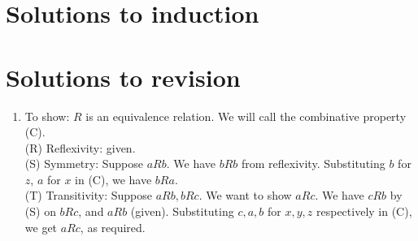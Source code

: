 \documentclass[10pt,a4paper]{article}
\begin{document}
\newpage

\section{Solutions to induction}

\section{Solutions to revision}
\begin{enumerate}
    \item To show: \(R\) is an equivalence relation. We will call the combinative property (C).\\
    (R) Reflexivity: given. \\
    (S) Symmetry: Suppose \( a R b \). We have \(b R b\) from reflexivity.
    Substituting \(b\) for \(z\), \(a\) for \(x\) in (C), we have \(b R a\). \\
    (T) Transitivity: Suppose \( a R b, b R c \). We want to show \( a R c \).
    We have \(c R b\) by (S) on \(b R c\), and \(a R b\) (given).
    Substituting \(c, a, b\) for \(x, y, z\) respectively in (C), we get \(a R c\), as required.
\end{enumerate}
\end{document}
